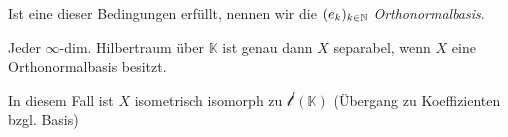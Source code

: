 \documentclass{cheat-sheet}
\newcommand{\K}{\mathbb{K}}
\begin{document}
\begin{defn}
  Ist eine dieser Bedingungen erfüllt, nennen wir die $(e_k)_{k \in \mathbb{N}}$ \emph{Orthonormalbasis}.
\end{defn}

\begin{satz}
  Jeder $\infty$-dim. Hilbertraum über $\K$ ist genau dann $X$ separabel, wenn $X$ eine Orthonormalbasis besitzt.
\end{satz}

\begin{bem}
  In diesem Fall ist $X$ isometrisch isomorph zu $\mathcal{l}^l(\K)$ (Übergang zu Koeffizienten bzgl. Basis)
\end{bem}
\end{document}
